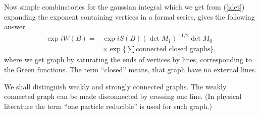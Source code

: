 \documentclass[12pt]{article}
\begin{document}
	Now simple combinatorics for the gaussian integral which we get from
(\ref{idet})
	expanding the exponent containing vertices in a formal series,
	gives the following answer
\begin{equation}
\begin{split}
    \exp i W(B) = &\exp i S(B) (\det M_{1})^{-1/2}
	\det M_{0} \\
    & \times \exp \{ \sum \text{connected closed graphs}\} ,
\end{split}
\end{equation}
	where we get graph by saturating the ends of vertices
	by lines, corresponding to the Green functions.
	The term ``closed'' means, that graph have no external lines.

	We shall distinguish weakly and strongly connected graphs.
	The weakly connected graph can be made disconnected by 
	crossing one line. 
	(In physical literature the term ``one	particle reducible'' 
	is used for such graph.)
\end{document}
